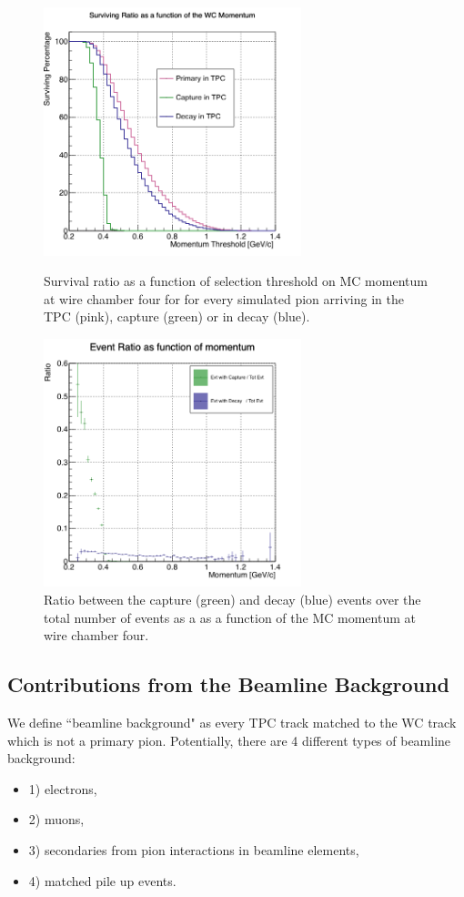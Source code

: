 \begin{figure}[]
\centering
\begin{minipage}[t]{0.45\textwidth}
\centering
\includegraphics[width=7.5cm]{Chapter-7/Images/CDThreshold.png}
\caption{Survival ratio as a function of selection threshold on MC momentum at wire chamber four for for every simulated pion arriving in the TPC (pink), capture (green) or in decay (blue).   }
\label{fig:survRatio}
\end{minipage}\hfill
\begin{minipage}[t]{0.45\textwidth}
\centering
\includegraphics[width=7.5cm]{Chapter-7/Images/CDRatio.png}
\caption{Ratio between the capture (green) and decay (blue) events over the total number of events as a as a function of the MC momentum at wire chamber four.}
\label{fig:evtRatio}
\end{minipage}
\end{figure}

\clearpage
\subsection{Contributions from the Beamline Background}\label{ch:PionXSBkgSub2}
We define ``beamline background" as every TPC track matched to the WC track which is not a primary pion. Potentially, there are 4 different types of beamline background:
\begin{itemize}
\item[]1) electrons,
\item[]2) muons,
\item[]3) secondaries from pion interactions in beamline elements,
\item[]4) matched pile up events.
\end{itemize}

